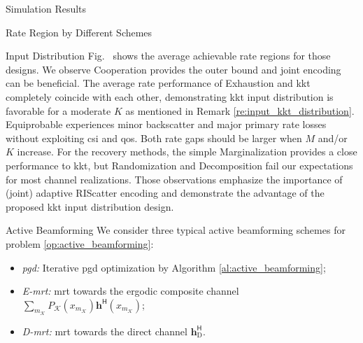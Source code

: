 \documentclass[journal]{IEEEtran}
\begin{document}
\begin{section}{Simulation Results}
\begin{subsection}{Rate Region by Different Schemes}
\begin{subsubsection}{Input Distribution}
			Fig.~ shows the average achievable rate regions for those designs.
			We observe Cooperation provides the outer bound and joint encoding can be beneficial.
			The average rate performance of Exhaustion and \gls{kkt} completely coincide with each other, demonstrating \gls{kkt} input distribution is favorable for a moderate $K$ as mentioned in Remark \ref{re:input_kkt_distribution}.
			Equiprobable experiences minor backscatter and major primary rate losses without exploiting \gls{csi} and \gls{qos}.
			Both rate gaps should be larger when $M$ and/or $K$ increase.
			For the recovery methods, the simple Marginalization provides a close performance to \gls{kkt}, but Randomization and Decomposition fail our expectations for most channel realizations.
			Those observations emphasize the importance of (joint) adaptive RIScatter encoding and demonstrate the advantage of the proposed \gls{kkt} input distribution design.
		\end{subsubsection}

		\begin{subsubsection}{Active Beamforming}
			We consider three typical active beamforming schemes for problem \eqref{op:active_beamforming}:
			\begin{itemize}
				\item \emph{\gls{pgd}:} Iterative \gls{pgd} optimization by Algorithm \ref{al:active_beamforming};
				\item \emph{E-\gls{mrt}:} \gls{mrt} towards the ergodic composite channel $\sum_{m_{\mathcal{K}}} P_{\mathcal{K}}(x_{m_{\mathcal{K}}}) \boldsymbol{h}^\mathsf{H}(x_{m_{\mathcal{K}}})$;
				\item \emph{D-\gls{mrt}:} \gls{mrt} towards the direct channel $\boldsymbol{h}_{\text{D}}^\mathsf{H}$.
			\end{itemize}


\end{subsubsection}
\end{subsection}
\end{section}
\end{document}
